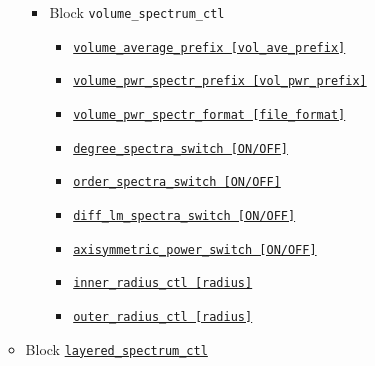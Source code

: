 \begin{itemize}
\begin{itemize}
		\begin{itemize}
		\item Block \verb|volume_spectrum_ctl|
			\begin{itemize}
			\item \hyperref[href_t:volume_average_prefix]
				{\tt volume\_average\_prefix      [vol\_ave\_prefix]}
			\item \hyperref[href_t:volume_pwr_spectr_prefix]
				{\tt volume\_pwr\_spectr\_prefix  [vol\_pwr\_prefix]}
        	\item \hyperref[href_t:volume_pwr_spectr_format]
		    	{\tt volume\_pwr\_spectr\_format    [file\_format]}
%
			\item \hyperref[href_t:degree_spectra_switch]
				{\tt degree\_spectra\_switch           [ON/OFF]}
			\item \hyperref[href_t:order_spectra_switch]
				{\tt order\_spectra\_switch           [ON/OFF]}
			\item \hyperref[href_t:diff_lm_spectra_switch]
				{\tt diff\_lm\_spectra\_switch           [ON/OFF]}
			\item \hyperref[href_t:axisymmetric_power_switch]
				{\tt axisymmetric\_power\_switch           [ON/OFF]}
%
			\item \hyperref[href_t:inner_radius_ctl]
				{\tt inner\_radius\_ctl           [radius]}
			\item \hyperref[href_t:outer_radius_ctl]
				{\tt outer\_radius\_ctl           [radius]}
			\end{itemize}
		\end{itemize}
%
	\item Block \hyperref[href_t:layered_spectrum_ctl]{\tt layered\_spectrum\_ctl}
\end{itemize}
\end{itemize}
